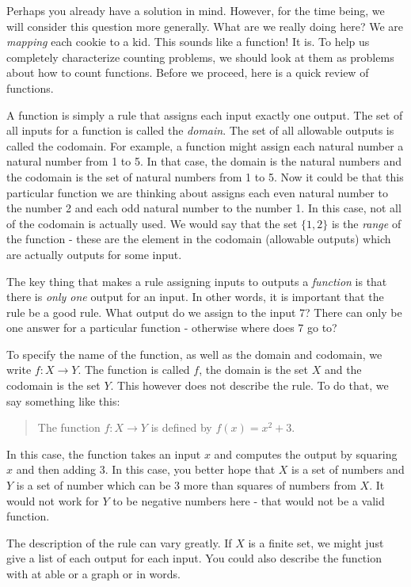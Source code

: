 \documentclass[12pt]{article}
\begin{document}
Perhaps you already have a solution in mind.  However, for the time being, we will consider this question more generally.  What are we really doing here?  We are {\em mapping} each cookie to a kid.  This sounds like a function!  It is.  To help us completely characterize counting problems, we should look at them as problems about how to count functions.  Before we proceed, here is a quick review of functions.

A function is simply a rule that assigns each input exactly one output.  The set of all inputs for a function is called the {\em domain}.  The set of all allowable outputs is called the codomain.  For example, a function might assign each natural number a natural number from 1 to 5.  In that case, the domain is the natural numbers and the codomain is the set of natural numbers from 1 to 5. Now it could be that this particular function we are thinking about assigns each even natural number to the number 2 and each odd natural number to the number 1.  In this case, not all of the codomain is actually used.  We would say that the set $\{1,2\}$ is the {\em range} of the function - these are the element in the codomain (allowable outputs) which are actually outputs for some input. 

The key thing that makes a rule assigning inputs to outputs a {\em function} is that there is {\em only one} output for an input.  In other words, it is important that the rule be a good rule.  What output do we assign to the input 7?  There can only be one answer for a particular function - otherwise where does 7 go to?  

To specify the name of the function, as well as the domain and codomain, we write $f:X \to Y$.  The function is called $f$, the domain is the set $X$ and the codomain is the set $Y$.  This however does not describe the rule.  To do that, we say something like this:

\begin{quote}
  The function $f:X \to Y$ is defined by $f(x) = x^2 + 3$.
\end{quote}

In this case, the function takes an input $x$ and computes the output by squaring $x$ and then adding 3.  In this case, you better hope that $X$ is a set of numbers and $Y$ is a set of number which can be 3 more than squares of numbers from $X$.  It would not work for $Y$ to be negative numbers here - that would not be a valid function.

The description of the rule can vary greatly.  If $X$ is a finite set, we might just give a list of each output for each input.  You could also describe the function with at able or a graph or in words.
\end{document}
